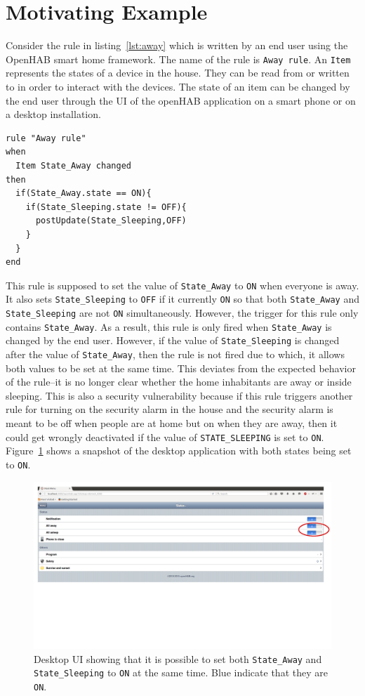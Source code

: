 \documentclass{sig-alternate-05-2015}
\begin{document}
\section{Motivating Example}
\label{sec:motivation}
Consider the rule in listing~\ref{lst:away} which is written by an end user using the OpenHAB smart home framework. The name of the rule is \texttt{Away rule}. An \texttt{Item} represents the states of a device in the house. They can be read from or written to in order to interact with the devices. The state of an item can be changed by the end user through the UI of the openHAB application on a smart phone or on a desktop installation.
\begin{lstlisting}[caption={Rule for setting the Away or Sleeping state.},label={lst:away}]
rule "Away rule"
when
  Item State_Away changed 	
then
  if(State_Away.state == ON){
    if(State_Sleeping.state != OFF){
      postUpdate(State_Sleeping,OFF)
    }
  }
end
\end{lstlisting}
This rule is supposed to set the value of \texttt{State\_Away} to \texttt{ON} when everyone is away. It also sets \texttt{State\_Sleeping} to \texttt{OFF} if it currently \texttt{ON} so that both \texttt{State\_Away} and \texttt{State\_Sleeping} are not \texttt{ON} simultaneously. However, the trigger for this rule only contains \texttt{State\_Away}. As a result, this rule is only fired when \texttt{State\_Away} is changed by the end user. However, if the value of \texttt{State\_Sleeping} is changed after the value of \texttt{State\_Away}, then the rule is not fired due to which, it allows both values to be set at the same time. This deviates from the expected behavior of the rule--it is no longer clear whether the home inhabitants are away or inside sleeping. This is also a security vulnerability because if this rule triggers another rule for turning on the security alarm in the house and the security alarm is meant to be off when people are at home but on when they are away, then it could get wrongly deactivated if the value of \texttt{STATE\_SLEEPING} is set to \texttt{ON}. Figure~\ref{fig:awayrule} shows a snapshot of the desktop application with both states being set to \texttt{ON}. 
\begin{figure}
\centering
\includegraphics [trim=1cm 13cm 0 0, scale=0.14]{images/openhab-runtime.png}
\caption{Desktop UI showing that it is possible to set both \texttt{State\_Away} and \texttt{State\_Sleeping} to \texttt{ON} at the same time. Blue indicate that they are \texttt{ON}.}
\label{fig:awayrule}
\end{figure}
\end{document}
